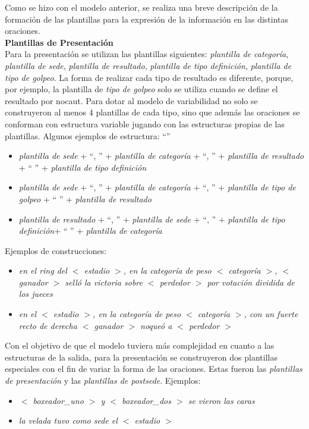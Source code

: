     Como se hizo con el modelo anterior, se realiza una breve descripción de la formación de las plantillas para la expresión de la información en las distintas oraciones.\\

    \textbf{Plantillas de Presentación}\\

    Para la presentación se utilizan las plantillas siguientes: \textit{plantilla de categoría}, \textit{plantilla de sede}, 
\textit{plantilla de resultado}, \textit{plantilla de tipo definición}, \textit{plantilla de tipo de golpeo}. La forma de realizar cada tipo de resultado es diferente, porque, 
por ejemplo, la plantilla de \textit{tipo de golpeo} solo se utiliza cuando se define el resultado por nocaut. Para dotar 
al modelo de variabilidad no solo se construyeron al menos 4 plantillas de cada tipo, sino que además las oraciones se conforman 
con estructura variable jugando con las estructuras propias de las plantillas.
    Algunos ejemplos de estructura:  “”
    \begin{itemize}
        \item \textit{plantilla de sede} + “, ” + \textit{plantilla de categoría} + “, ” + \textit{plantilla de resultado} + “ ” + \textit{plantilla de tipo definición}
        \item \textit{plantilla de sede} + “, ” + \textit{plantilla de categoría} + “, ” + \textit{plantilla de tipo de golpeo} + “ ” + \textit{plantilla de resultado}
        \item \textit{plantilla de resultado} + “, ” + \textit{plantilla de sede} + “, ” + \textit{plantilla de tipo definición}+ “ ” + \textit{plantilla de categoría}
    \end{itemize}

    Ejemplos de construcciones:
    \begin{itemize}
        \item \textit{ en el ring del $<$ estadio $>$, en la categoría de peso $<$ categoría $>$, $<$ ganador $>$ selló la victoria 
        sobre $<$ perdedor $>$ por votación dividida de los jueces}
        \item \textit{ en el $<$ estadio $>$, en la categoría de peso $<$ categoría $>$, con un fuerte recto de derecha $<$ ganador $>$ noqueó a $<$ perdedor $>$}
    \end{itemize}

    Con el objetivo de que el modelo tuviera más complejidad en cuanto a las estructuras de la salida, para la presentación se construyeron dos 
plantillas especiales con el fin de variar la forma de las oraciones. Estas fueron las \textit{plantillas de presentación} y las 
\textit{plantillas de postsede}.
    Ejemplos:
    \begin{itemize}
        \item \textit{$<$ boxeador\_uno $>$ y $<$ boxeador\_dos $>$ se vieron las caras}
        \item \textit{la velada tuvo como sede el $<$ estadio $>$}
    \end{itemize}

